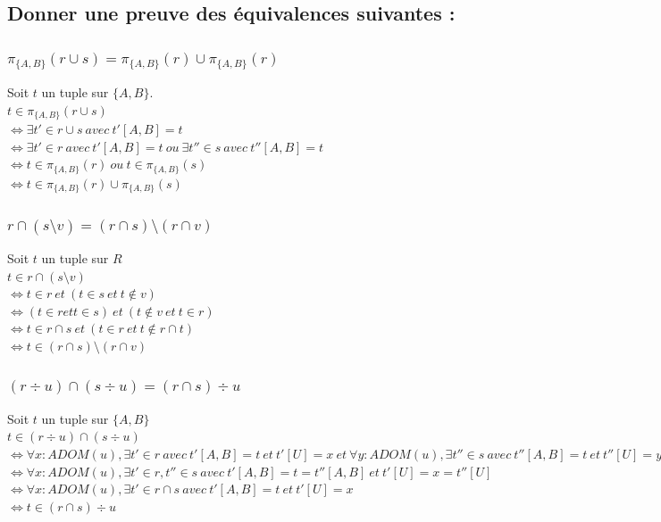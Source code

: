 \documentclass[10pt,a4paper,twoside]{article}
\begin{document}
\subsection{Donner une preuve des équivalences suivantes :}
\subsubsection{$\pi_{\{A,B\}}(r \cup s) = \pi_{\{A,B\}}(r) \cup \pi_{\{A,B\}}(r)$}
\begin{flushleft}
Soit $t$ un tuple sur $\{A,B\}$.\\
$t \in \pi_{\{A,B\}}(r \cup s)$\\
$\Leftrightarrow \exists t'\in r \cup s\ avec\ t'[A,B] = t $\\
$\Leftrightarrow \exists t'\in r\ avec\ t'[A,B] = t\ ou\ \exists t''\in s\ avec\ t''[A,B] = t$
$\Leftrightarrow t \in \pi_{\{A,B\}}(r)\ ou\ t \in \pi_{\{A,B\}}(s)$\\
$\Leftrightarrow t \in \pi_{\{A,B\}}(r) \cup \pi_{\{A,B\}}(s)$
\end{flushleft}

\subsubsection{$ r \cap (s \setminus v)=(r\cap s) \setminus (r\cap v) $}
\begin{flushleft}
Soit $t$ un tuple sur $R$\\
$t \in r \cap (s \setminus v)$\\
$\Leftrightarrow t \in r\ et\ (t \in s\ et\ t \not\in v)$\\
$\Leftrightarrow (t \in r et t \in s)\ et\ (t \not\in v\ et\ t \in r)$\\
$\Leftrightarrow t \in r \cap s\ et\ (t \in r\ et\ t \not\in r\cap t)$\\
$\Leftrightarrow t \in (r\cap s) \setminus (r\cap v)$
\end{flushleft}

\subsubsection{$(r \div u) \cap (s \div u) = (r \cap s) \div u$}
\begin{flushleft}
Soit $t$ un tuple sur $\{A,B\}$\\
$t \in  (r \div u) \cap (s \div u)$\\
$\Leftrightarrow \forall x:ADOM(u), \exists t'\in r\ avec\ t'[A,B]=t\ et\ t'[U] = x\ et\ \forall y:ADOM(u), \exists t''\in s\ avec\ t''[A,B]=t\ et\ t''[U] = y$\\
$\Leftrightarrow \forall x:ADOM(u), \exists t'\in r, t''\in s\ avec\ t'[A,B]=t=t''[A,B]\ et\ t'[U]=x=t''[U] $\\
$\Leftrightarrow  \forall x:ADOM(u), \exists t'\in r \cap s\ avec\ t'[A,B]=t\ et\ t'[U]=x$\\
$\Leftrightarrow t \in (r \cap s) \div u$\
\end{flushleft}
\end{document}
